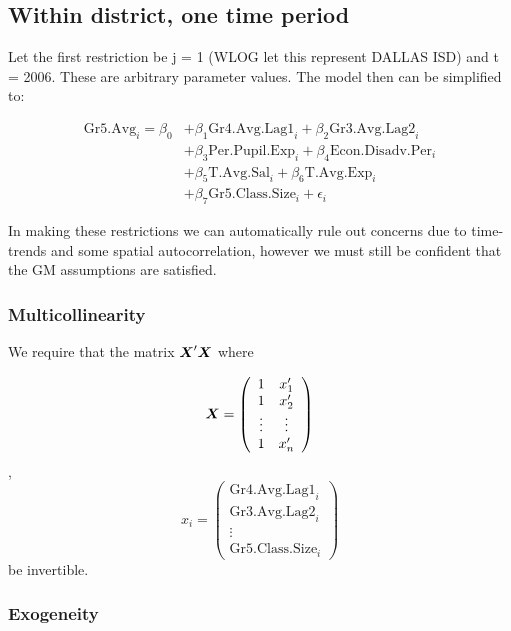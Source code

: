 \documentclass[11pt]{article}
\newcommand{\bX}{\mbox{\boldmath $X$}}
\begin{document}
\subsection{Within district, one time period}
\label{ss:nextsub1}

Let the first restriction be j = 1 (WLOG let this represent DALLAS ISD) and t = 2006. These are arbitrary parameter values. The model then can be simplified to:

\begin{align*}
\mathrm{Gr5.Avg}_{i} = \beta_{0} 
    &+ \beta_{1}  \mathrm{Gr4.Avg.Lag1}_{i} 
    + \beta_{2}  \mathrm{Gr3.Avg.Lag2}_{i}    \\
    &+ \beta_{3}  \mathrm{Per.Pupil.Exp}_{i} 
    + \beta_{4}  \mathrm{Econ.Disadv.Per}_{i} \\
    &+ \beta_{5}  \mathrm{T.Avg.Sal}_{i}   
    + \beta_{6}  \mathrm{T.Avg.Exp}_{i}  \\
    &+ \beta_{7}  \mathrm{Gr5.Class.Size}_{i} + \epsilon_{i}
\end{align*}

In making these restrictions we can automatically rule out concerns due to time-trends and some spatial autocorrelation, however we must still be confident that the GM assumptions are satisfied.

\subsubsection{Multicollinearity}

We require that the matrix $\bX'\bX$ where

$$\bX = \left( \begin{array}{cc}
1 & x_1' \\ 1 & x_2' \\ \vdots & \vdots \\ 1 & x_n' \end{array}
\right)$$,    
$$x_i = \left( \begin{array}{cc}
 \mathrm{Gr4.Avg.Lag1}_{i} \\  \mathrm{Gr3.Avg.Lag2}_{i} \\ \vdots \\ \mathrm{Gr5.Class.Size}_{i} \end{array}
\right)$$ be invertible. 

\subsubsection{Exogeneity}
\end{document}
